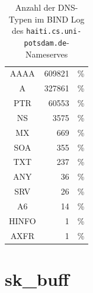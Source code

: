 \documentclass[a4paper, 12pt, BCOR10mm, DIV12, toc=bibliography, toc=listof, german]{scrbook}
\begin{document}
		\begin{table}
			\centering
			\begin{tabular}{|c|rr|}\hline
				AAAA & 609821 & \unit[60,791]{\%}\\
				A & 327861 & \unit[32,683]{\%}\\
				PTR & 60553 & \unit[6,036]{\%} \\
				NS & 3575 & \unit[0,356]{\%}\\
				MX & 669 & \unit[0,067]{\%}\\
				SOA& 355 & \unit[0,035]{\%} \\
				TXT& 237 & \unit[0,024]{\%} \\
				ANY& 36 & \unit[0,004]{\%} \\
				SRV& 26 & \unit[0,003]{\%} \\
				A6& 14 & \unit[0,001]{\%} \\
				HINFO& 1 & \unit[0,000]{\%} \\
				AXFR& 1 & \unit[0,000]{\%} \\\hline
			\end{tabular}
			\caption{Anzahl der DNS-Typen im BIND Log des \texttt{haiti.cs.uni-potsdam.de}-Nameserves}
			\label{tab:log}
		\end{table}


	\chapter{sk\_buff} %
	\label{cha:skbuff}

	



	\backmatter

	\listoffigures{}
	\listoftables{}

	
	

\end{document}
